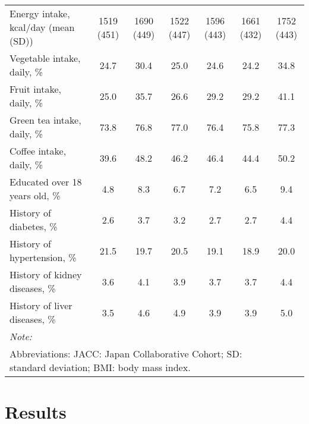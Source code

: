 \documentclass[nutrients,article,submitted,moreauthors,pdftex]{Definitions/mdpi}
\begin{document}
\begin{table}[h]
{\begin{tabular}[t]{lcccccc}
\hspace{1em}Energy intake, kcal/day (mean (SD)) & 1519 (451) & 1690 (449) & 1522 (447) & 1596 (443) & 1661 (432) & 1752 (443)\\
\hspace{1em}Vegetable intake, daily, \% & 24.7 & 30.4 & 25.0 & 24.6 & 24.2 & 34.8\\
\rowcolor{gray!6}  \hspace{1em}Fruit intake, daily, \% & 25.0 & 35.7 & 26.6 & 29.2 & 29.2 & 41.1\\
\hspace{1em}Green tea intake, daily, \% & 73.8 & 76.8 & 77.0 & 76.4 & 75.8 & 77.3\\
\rowcolor{gray!6}  \hspace{1em}Coffee intake, daily, \% & 39.6 & 48.2 & 46.2 & 46.4 & 44.4 & 50.2\\
\hspace{1em}Educated over 18 years old, \% & 4.8 & 8.3 & 6.7 & 7.2 & 6.5 & 9.4\\
\rowcolor{gray!6}  \hspace{1em}History of diabetes, \% & 2.6 & 3.7 & 3.2 & 2.7 & 2.7 & 4.4\\
\hspace{1em}History of hypertension, \% & 21.5 & 19.7 & 20.5 & 19.1 & 18.9 & 20.0\\
\rowcolor{gray!6}  \hspace{1em}History of kidney diseases, \% & 3.6 & 4.1 & 3.9 & 3.7 & 3.7 & 4.4\\
\hspace{1em}History of liver diseases, \% & 3.5 & 4.6 & 4.9 & 3.9 & 3.9 & 5.0\\
\bottomrule
\multicolumn{6}{l}{\textit{Note: }}\\
\multicolumn{6}{l}{Abbreviations: JACC: Japan Collaborative Cohort; SD: standard deviation; BMI: body mass index.   }\\
\end{tabular}}
\end{table}

\hypertarget{results}{%
\section{Results}\label{results}}
\end{document}
